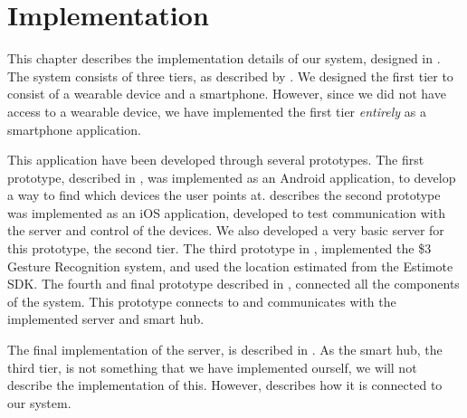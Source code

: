 \chapter{Implementation}\label{chap:implementation}
%
This chapter describes the implementation details of our system, 
designed in . 
The system consists of three tiers, as described by .
We designed the first tier to consist of a wearable device and a smartphone. 
However, since we did not have access to a wearable device, 
we have implemented the first tier \emph{entirely} as a smartphone application. 

This application have been developed through several prototypes. 
The first prototype, described in , 
was implemented as an Android application, 
to develop a way to find which devices the user points at. 
 describes the second prototype was implemented as an iOS application,
developed to test communication with the server and control of the devices. 
We also developed a very basic server for this prototype, \ie the second tier. 
The third prototype in , 
implemented the \$3 Gesture Recognition system,
and used the location estimated from the Estimote SDK. 
The fourth and final prototype described in , 
connected all the components of the system. 
This prototype connects to and communicates with the implemented server and smart hub. 

The final implementation of the server,
is described in . 
As the smart hub, the third tier, is not something that we have implemented ourself, 
we will not describe the implementation of this.
However,  describes how it is connected to our system. 


\FloatBarrier

\FloatBarrier

\FloatBarrier

\FloatBarrier
